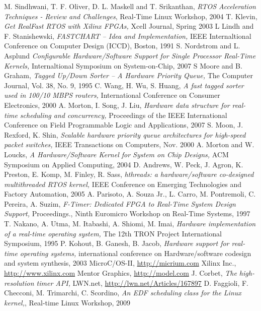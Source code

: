\documentclass[10pt,a4paper]{article}
\begin{document}
\begin{multicols}{2}
\begin{thebibliography}{9}
 M. Sindhwani, T. F. Oliver, D. L. Maskell and T. Srikanthan, {\it RTOS Acceleration Techniques - Review and Challenges}, Real-Time Linux Workshop, 2004
 T. Klevin, {\it Get RealFast RTOS with Xilinx FPGAs,} Xcell Journal, Spring 2003
 L Lindh and F. Stanishewski, {\it FASTCHART – Idea and Implementation,} IEEE Internaltional Conference on Computer Design (ICCD), Boston, 1991
 S. Nordstrom and L. Asplund {\it Configurable Hardware/Software Support for Single Processor Real-Time Kernels,} Internaltional Symposium on System-on-Chip, 2007
 S Moore and B. Graham, {\it Tagged Up/Down Sorter – A Hardware Priority Queue,} The Computer Journal, Vol. 38, No. 9, 1995
 C. Wang, H. Wu, S. Huang, {\it A fast tagged sorter used in 100/10 MBPS routers,} International Conference on Consumer Electronics, 2000
 A. Morton, I. Song, J. Liu, {\it Hardware data structure for real-time scheduling and concurrency,} Proceedings of the IEEE International Conference on Field Programmable Logic and Applications, 2007
 S. Moon, J. Rexford, K. Shin, {\it Scalable hardware priority queue architectures for high-speed packet switches,} IEEE Transactions on Computers, Nov. 2000
 A. Morton and W. Loucks, {\it A Hardware/Software Kernel for System on Chip Designs,} ACM Symposium on Applied Computing, 2004
 D. Andrews, W. Peck, J. Agron, K. Preston, E. Komp, M. Finley, R. Sass, {\it hthreads: a hardware/software co-designed multithreaded RTOS kernel,} IEEE Conference on Emerging Technologies and Factory Automation, 2005
 A. Parisoto, A. Souza Jr., L. Carro, M. Pontremoli, C. Pereira, A. Suzim, {\it F-Timer: Dedicated FPGA to Real-Time System Design Support,} Proceedings., Ninth Euromicro Workshop on Real-Time Systems, 1997
 T. Nakano, A. Utma, M. Itabashi, A. Shiomi, M. Imai, {\it Hardware implementation of a real-time operating system,} The 12th TRON Project International Symposium, 1995
 P. Kohout, B. Ganesh, B. Jacob, {\it Hardware support for real-time operating systems,} international conference on Hardware/software codesign and system synthesis, 2003
 MicroC/OS-II, \url{http://micrium.com}
 Xilinx Inc., \url{http://www.xilinx.com}
 Mentor Graphics, \url{http://model.com}
 J. Corbet, {\it The high-resolution timer API,} LWN.net, \url{http://lwn.net/Articles/167897}
 D. Faggioli, F. Checconi, M. Trimarchi, C. Scordino, {\it An EDF scheduling class for the Linux kernel,}, Real-time Linux Workshop, 2009
\end{thebibliography}

\end{multicols}
\end{document}

